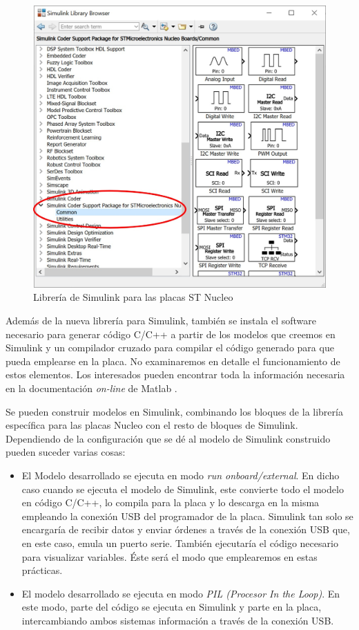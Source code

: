 \documentclass[10pt,a4paper]{report}
\begin{document}
\begin{figure}
\centering
\includegraphics[scale=0.5]{sbroser.jpg}
\caption{Librería de Simulink para las placas ST Nucleo}\label{f16}
\end{figure} 

Además de la nueva librería para Simulink, también se instala el software necesario para generar código C/C++ a partir de los modelos que creemos en Simulink  y un compilador cruzado para compilar el código generado para que pueda emplearse en la placa. No examinaremos en detalle el funcionamiento de estos elementos. Los interesados pueden encontrar toda la información necesaria en la documentación \emph{on-line} de Matlab \cite{slkhelp}.

Se pueden construir modelos en Simulink, combinando los bloques de la librería específica para las placas Nucleo con el resto de bloques de Simulink. Dependiendo de la configuración que se dé al modelo de Simulink construido pueden suceder varias cosas:
\begin{itemize}
\item El Modelo desarrollado se ejecuta en modo \emph{run onboard/external}. En dicho caso cuando se ejecuta el modelo de Simulink, este convierte todo el modelo en código C/C++, lo compila para la placa y lo descarga en la misma empleando la conexión USB del programador de la placa. Simulink tan solo se encargaría de recibir datos y enviar órdenes a través de la conexión USB que, en este caso, emula un puerto serie. También ejecutaría el código necesario para visualizar variables.  Éste será el modo que emplearemos en estas prácticas.

\item El modelo desarrollado se ejecuta en modo \emph{PIL (Procesor In the Loop)}. En este modo, parte del código se ejecuta en Simulink y parte en la placa, intercambiando ambos sistemas información a través de la conexión USB. 
 
\end{itemize}
\end{document}
